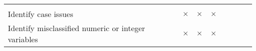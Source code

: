 \documentclass[]{article}
\begin{document}
\begin{longtable}[]{@{}lccccccc@{}}
\begin{minipage}[t]{0.06\columnwidth}
\strut
\end{minipage}\tabularnewline
\begin{minipage}[t]{0.33\columnwidth}\raggedright\strut
Identify case issues\strut
\end{minipage} & \begin{minipage}[t]{0.07\columnwidth}\centering\strut
\(\times\)\strut
\end{minipage} & \begin{minipage}[t]{0.07\columnwidth}\centering\strut
\(\times\)\strut
\end{minipage} & \begin{minipage}[t]{0.07\columnwidth}\centering\strut
\(\times\)\strut
\end{minipage} & \begin{minipage}[t]{0.07\columnwidth}\centering\strut
\strut
\end{minipage} & \begin{minipage}[t]{0.07\columnwidth}\centering\strut
\strut
\end{minipage} & \begin{minipage}[t]{0.06\columnwidth}\centering\strut
\strut
\end{minipage} & \begin{minipage}[t]{0.06\columnwidth}\centering\strut
\strut
\end{minipage}\tabularnewline
\begin{minipage}[t]{0.33\columnwidth}\raggedright\strut
Identify misclassified numeric or integer variables\strut
\end{minipage} & \begin{minipage}[t]{0.07\columnwidth}\centering\strut
\(\times\)\strut
\end{minipage} & \begin{minipage}[t]{0.07\columnwidth}\centering\strut
\(\times\)\strut
\end{minipage} & \begin{minipage}[t]{0.07\columnwidth}\centering\strut
\(\times\)\strut
\end{minipage} & \begin{minipage}[t]{0.07\columnwidth}\centering\strut
\strut
\end{minipage} & \begin{minipage}[t]{0.07\columnwidth}\centering\strut
\strut
\end{minipage} & \begin{minipage}[t]{0.06\columnwidth}\centering\strut
\strut
\end{minipage} & \begin{minipage}[t]{0.06\columnwidth}\centering\strut

\end{minipage}
\end{longtable}
\end{document}
